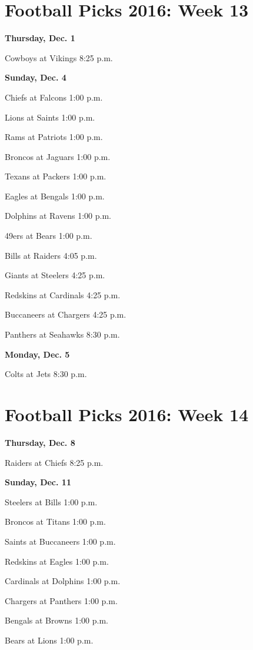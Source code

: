 \documentclass[12pt, letterpaper]{article}
\begin{document}
\newpage \section*{\Huge Football Picks 2016: Week 13}
\noindent \Large \textbf{Thursday, Dec. 1} \par
Cowboys at Vikings 8:25 p.m.\par
\noindent \Large \textbf{Sunday, Dec. 4} \par
Chiefs at Falcons 1:00 p.m.\par
Lions at Saints 1:00 p.m.\par
Rams at Patriots 1:00 p.m.\par
Broncos at Jaguars 1:00 p.m.\par
Texans at Packers 1:00 p.m.\par
Eagles at Bengals 1:00 p.m.\par
Dolphins at Ravens 1:00 p.m.\par
49ers at Bears 1:00 p.m.\par
Bills at Raiders 4:05 p.m.\par
Giants at Steelers 4:25 p.m.\par
Redskins at Cardinals 4:25 p.m.\par
Buccaneers at Chargers 4:25 p.m.\par
Panthers at Seahawks 8:30 p.m.\par
\noindent \Large \textbf{Monday, Dec. 5} \par
Colts at Jets 8:30 p.m.\par
\newpage \section*{\Huge Football Picks 2016: Week 14}
\noindent \Large \textbf{Thursday, Dec. 8} \par
Raiders at Chiefs 8:25 p.m.\par
\noindent \Large \textbf{Sunday, Dec. 11} \par
Steelers at Bills 1:00 p.m.\par
Broncos at Titans 1:00 p.m.\par
Saints at Buccaneers 1:00 p.m.\par
Redskins at Eagles 1:00 p.m.\par
Cardinals at Dolphins 1:00 p.m.\par
Chargers at Panthers 1:00 p.m.\par
Bengals at Browns 1:00 p.m.\par
Bears at Lions 1:00 p.m.\par
\end{document}
